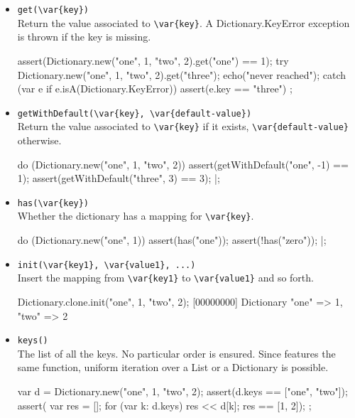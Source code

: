 \begin{itemize}
\item \lstinline|get(\var{key})|\\
  Return the value associated to \lstinline|\var{key}|.  A
  Dictionary.KeyError exception is thrown if the key is missing.

\begin{urbiscript}
assert(Dictionary.new("one", 1, "two", 2).get("one") == 1);
try
{
  Dictionary.new("one", 1, "two", 2).get("three");
  echo("never reached");
}
catch (var e if e.isA(Dictionary.KeyError))
{
  assert(e.key == "three")
};
\end{urbiscript}


\item \lstinline|getWithDefault(\var{key}, \var{default-value})|\\
  Return the value associated to  \lstinline|\var{key}| if it exists,
  \lstinline|\var{default-value}| otherwise.

\begin{urbiscript}
do (Dictionary.new("one", 1, "two", 2))
{
  assert(getWithDefault("one",  -1) == 1);
  assert(getWithDefault("three", 3) == 3);
}|;
\end{urbiscript}


\item \lstinline|has(\var{key})|\\
  Whether the dictionary has a mapping for \lstinline|\var{key}|.

\begin{urbiscript}
do (Dictionary.new("one", 1))
{
  assert(has("one"));
  assert(!has("zero"));
}|;
\end{urbiscript}

\item \lstinline|init(\var{key1}, \var{value1}, ...)|~\\
  Insert the mapping from \lstinline|\var{key1}| to
  \lstinline|\var{value1}| and so forth.

\begin{urbiscript}
Dictionary.clone.init("one", 1, "two", 2);
[00000000] Dictionary {"one" => 1, "two" => 2}
\end{urbiscript}

\item \lstinline|keys()|\\
  The list of all the keys.  No particular order is ensured.  Since
   features the same function, uniform iteration over
  a List or a Dictionary is possible.
\begin{urbiscript}
{
  var d = Dictionary.new("one", 1, "two", 2);
  assert(d.keys == ["one", "two"]);
  assert({
           var res = [];
           for (var k: d.keys)
             res << d[k];
           res
         }
         == [1, 2]);
};
\end{urbiscript}


\end{itemize}
